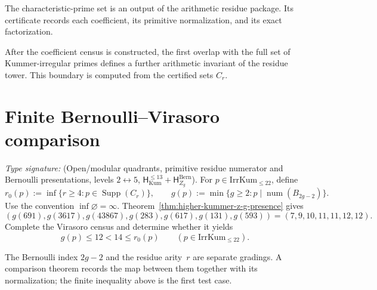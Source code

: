 \begin{remark}
\label{rem:characteristic-s-r-primes}
The characteristic-prime set is an output of the arithmetic residue
package.  Its certificate records each coefficient, its primitive
normalization, and its exact factorization.
\end{remark}

\begin{remark}
\label{rem:2111-sharpness}
After the coefficient census is constructed, the first overlap with
the full set of Kummer-irregular primes defines a further arithmetic
invariant of the residue tower.  This boundary is computed from the
certified sets \(C_r\).
\end{remark}

\section{Finite Bernoulli--Virasoro comparison}

\begin{problem}
\ClaimStatusOpen
\label{thm:higher-kummer-refined-duality}
\emph{Type signature:}
\textup{(Open/modular quadrants, primitive residue numerator and
Bernoulli presentations, levels \(2\leftrightarrow5\),
\(\mathsf H_{\mathrm{Kum}}^{\le13}
+\mathsf H_{Z_g}^{\mathrm{Bern}}\)).}
For \(p\in\mathrm{IrrKum}_{\le22}\), define
\[
 r_0(p):=\inf\{r\ge4:p\in\operatorname{Supp}(C_r)\},
 \qquad
 g(p):=\min\{g\ge2:p\mid\operatorname{num}(B_{2g-2})\}.
\]
Use the convention \(\inf\varnothing=\infty\).
Theorem~\ref{thm:higher-kummer-z-g-presence} gives
\[
 (g(691),g(3617),g(43867),g(283),g(617),g(131),g(593))
 =(7,9,10,11,11,12,12).
\]
Complete the Virasoro census and determine whether it yields
\begin{equation}
 g(p)\le12<14\le r_0(p)
 \qquad(p\in\mathrm{IrrKum}_{\le22}).
 \label{eq:boundary-inequality}
\end{equation}
\end{problem}

\begin{remark}
\label{rem:higher-kummer-weight-boundary}
The Bernoulli index \(2g-2\) and the residue arity~\(r\) are separate
gradings.  A comparison theorem records the map between them together
with its normalization; the finite inequality above is the first
test case.
\end{remark}
